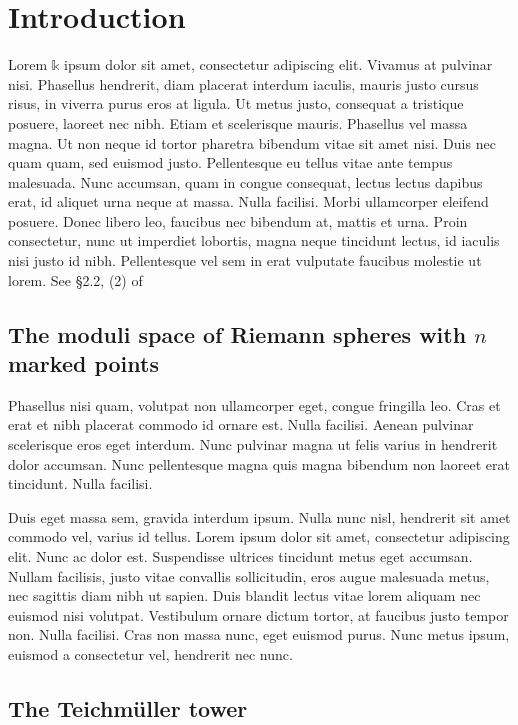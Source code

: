 \chapter{Introduction}
Lorem $\mathbb{k}$ ipsum dolor sit amet, consectetur adipiscing elit. Vivamus at pulvinar nisi. Phasellus hendrerit, diam placerat interdum iaculis, mauris justo cursus risus, in viverra purus eros at ligula. Ut metus justo, consequat a tristique posuere, laoreet nec nibh. Etiam et scelerisque mauris. Phasellus vel massa magna. Ut non neque id tortor pharetra bibendum vitae sit amet nisi. Duis nec quam quam, sed euismod justo. Pellentesque eu tellus vitae ante tempus malesuada. Nunc accumsan, quam in congue consequat, lectus lectus dapibus erat, id aliquet urna neque at massa. Nulla facilisi. Morbi ullamcorper eleifend posuere. Donec libero leo, faucibus nec bibendum at, mattis et urna. Proin consectetur, nunc ut imperdiet lobortis, magna neque tincidunt lectus, id iaculis nisi justo id nibh. Pellentesque vel sem in erat vulputate faucibus molestie ut lorem.
See \S2.2, (2) of \cite{schneps_grothendieck-teichmuller_1997}

\section{The moduli space of Riemann spheres with \(n\) marked points}

Phasellus nisi quam, volutpat non ullamcorper eget, congue fringilla leo. Cras et erat et nibh placerat commodo id ornare est. Nulla facilisi. Aenean pulvinar scelerisque eros eget interdum. Nunc pulvinar magna ut felis varius in hendrerit dolor accumsan. Nunc pellentesque magna quis magna bibendum non laoreet erat tincidunt. Nulla facilisi.

Duis eget massa sem, gravida interdum ipsum. Nulla nunc nisl, hendrerit sit amet commodo vel, varius id tellus. Lorem ipsum dolor sit amet, consectetur adipiscing elit. Nunc ac dolor est. Suspendisse ultrices tincidunt metus eget accumsan. Nullam facilisis, justo vitae convallis sollicitudin, eros augue malesuada metus, nec sagittis diam nibh ut sapien. Duis blandit lectus vitae lorem aliquam nec euismod nisi volutpat. Vestibulum ornare dictum tortor, at faucibus justo tempor non. Nulla facilisi. Cras non massa nunc, eget euismod purus. Nunc metus ipsum, euismod a consectetur vel, hendrerit nec nunc.

\section{The Teichm\"uller tower}

